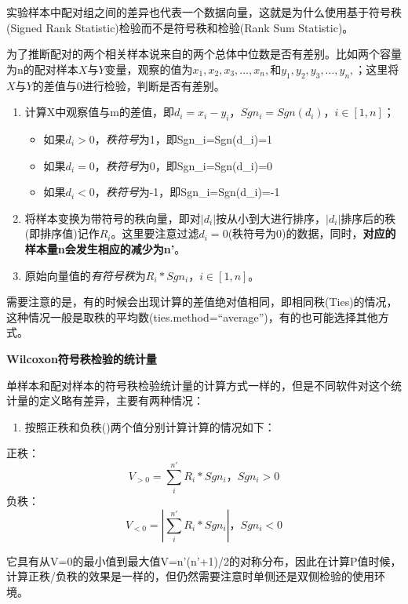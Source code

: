 \documentclass[
]{article}
\providecommand{\tightlist}{%
  \setlength{\itemsep}{0pt}\setlength{\parskip}{0pt}}
\begin{document}
实验样本中配对组之间的差异也代表一个数据向量，这就是为什么使用基于符号秩(Signed Rank Statistic)检验而不是符号秩和检验(Rank Sum Statistic)。

为了推断配对的两个相关样本说来自的两个总体中位数是否有差别。比如两个容量为n的配对样本\(X\text{与}Y\)变量，观察的值为\(x_1,x_2,x_3,\dots,x_n,\)和\(y_1,y_2,y_3,\dots,y_n,\)；这里将\(X\text{与}Y\)的差值与0进行检验，判断是否有差别。

\begin{enumerate}
\def\labelenumi{\arabic{enumi}.}
\tightlist
\item
  计算X中观察值与m的差值，即\(d_i=x_i-y_i，Sgn_i=Sgn(d_i)，i\in[1,n]\)；

  \begin{itemize}
  \tightlist
  \item
    如果\(d_i>0\)，\emph{秩符号}为1，即Sgn\_i=Sgn(d\_i)=1
  \item
    如果\(d_i=0\)，\emph{秩符号}为0，即Sgn\_i=Sgn(d\_i)=0
  \item
    如果\(d_i<0\)，\emph{秩符号}为-1，即Sgn\_i=Sgn(d\_i)=-1
  \end{itemize}
\item
  将样本变换为带符号的秩向量，即对\(|d_i|\)按从小到大进行排序，\(|d_i|\)排序后的秩(即排序值)记作\(R_i\)。这里要注意过滤\(d_i=0\)(秩符号为0)的数据，同时，\textbf{对应的样本量n会发生相应的减少为n'}。
\item
  原始向量值的\emph{有符号秩}为\(R_i*Sgn_i，i\in[1,n]\)。
\end{enumerate}

需要注意的是，有的时候会出现计算的差值绝对值相同，即相同秩(Ties)的情况，这种情况一般是取秩的平均数(ties.method=``average'')，有的也可能选择其他方式。

\textbf{Wilcoxon符号秩检验的统计量}

单样本和配对样本的符号秩检验统计量的计算方式一样的，但是不同软件对这个统计量的定义略有差异，主要有两种情况：

\begin{enumerate}
\def\labelenumi{\arabic{enumi}.}
\tightlist
\item
  按照正秩和负秩()两个值分别计算计算的情况如下：
\end{enumerate}

正秩：
\[V_{>0}=\sum_i^{n'}R_i*Sgn_i，Sgn_i>0\]
负秩：
\[V_{<0}=|\sum_i^{n'}R_i*Sgn_i|，Sgn_i<0\]

它具有从V=0的最小值到最大值V=n'(n'+1)/2的对称分布，因此在计算P值时候，计算正秩/负秩的效果是一样的，但仍然需要注意时单侧还是双侧检验的使用环境。
\end{document}
